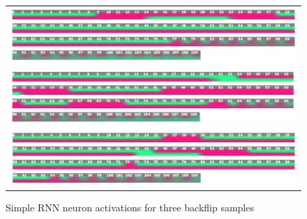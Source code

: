 \begin{figure}
   \centering
\begin{tabular}{c}
\includegraphics[width=\textwidth]{images/classifier/neuron-activations-simple-rnn-model-3/backflip-23-tiit}\\
\includegraphics[width=\textwidth]{images/classifier/neuron-activations-simple-rnn-model-3/backflip-40-margus}\\
\includegraphics[width=\textwidth]{images/classifier/neuron-activations-simple-rnn-model-3/backflip-6-rasmus}\\
\end{tabular}
    \caption{Simple RNN neuron activations for three backflip samples}
    \label{backflip-neuron-activations-simple-rnn}
\end{figure}

